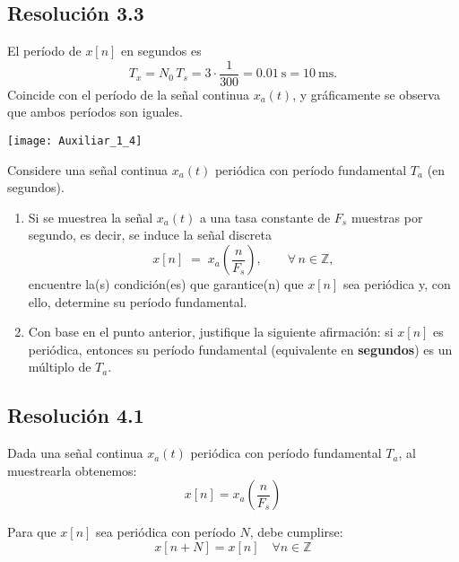 \documentclass[
  11pt,
  letterpaper,
   addpoints,
  ]{exam}
\begin{document}
\begin{questions}
\begin{solution}
\subsection*{Resolución 3.3}
El período de \(x[n]\) en segundos es
\begin{equation}
T_{\!x}=N_0\,T_s=3\cdot\frac{1}{300}=0.01\ \text{s}=10\ \text{ms}.
\end{equation}
Coincide con el período de la señal continua \(x_a(t)\), y gráficamente se observa que ambos períodos son iguales.
\begin{center}
  \texttt{[image: Auxiliar\_1\_4]}
\end{center}


\end{solution}

\question Considere una señal continua \(x_a(t)\) periódica con período fundamental \(T_a\) (en segundos).

\begin{enumerate}
  \item Si se muestrea la señal \(x_a(t)\) a una tasa constante de \(F_s\) muestras por segundo, es decir, se induce la señal discreta
  \begin{equation}
    x[n] \;=\; x_a\!\left(\frac{n}{F_s}\right), \qquad \forall\, n\in\mathbb{Z},
  \end{equation}
  encuentre la(s) condición(es) que garantice(n) que \(x[n]\) sea periódica y, con ello, determine su período fundamental.

  \item Con base en el punto anterior, justifique la siguiente afirmación:
  si \(x[n]\) es periódica, entonces su período fundamental (equivalente en \textbf{segundos}) es un múltiplo de \(T_a\).
\end{enumerate}

\begin{solution}

\subsection*{Resolución 4.1}

Dada una señal continua $x_a(t)$ periódica con período fundamental $T_a$, al muestrearla obtenemos:
\begin{equation}
x[n] = x_a\!\left(\frac{n}{F_s}\right)
\end{equation}

Para que $x[n]$ sea periódica con período $N$, debe cumplirse:
\begin{equation}
x[n+N] = x[n] \quad \forall n \in \mathbb{Z}
\end{equation}


\end{solution}
\end{questions}
\end{document}
